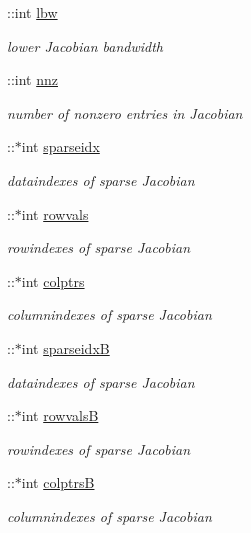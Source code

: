 \begin{DoxyCompactItemize}
\+::int \hyperlink{classamimodel_a784f5fb2b8eda576179be087c2a09a39}{lbw}
\begin{DoxyCompactList}\small\item\em lower Jacobian bandwidth \end{DoxyCompactList}\item 
\+::int \hyperlink{classamimodel_a825ec588729c090ff51ea3473dcbc6b9}{nnz}
\begin{DoxyCompactList}\small\item\em number of nonzero entries in Jacobian \end{DoxyCompactList}\item 
\+::$\ast$int \hyperlink{classamimodel_a6ffb112eda9ff756e17104210981b30b}{sparseidx}
\begin{DoxyCompactList}\small\item\em dataindexes of sparse Jacobian \end{DoxyCompactList}\item 
\+::$\ast$int \hyperlink{classamimodel_aa0abea3560da3f409a28567f42d52872}{rowvals}
\begin{DoxyCompactList}\small\item\em rowindexes of sparse Jacobian \end{DoxyCompactList}\item 
\+::$\ast$int \hyperlink{classamimodel_a887e8a11654afa197d040d8bb10cbb38}{colptrs}
\begin{DoxyCompactList}\small\item\em columnindexes of sparse Jacobian \end{DoxyCompactList}\item 
\+::$\ast$int \hyperlink{classamimodel_adcfae93a688a66f1954d0832f51e4cc0}{sparseidx\+B}
\begin{DoxyCompactList}\small\item\em dataindexes of sparse Jacobian \end{DoxyCompactList}\item 
\+::$\ast$int \hyperlink{classamimodel_a1ba81ee0e28fe7c7576911973c82be70}{rowvals\+B}
\begin{DoxyCompactList}\small\item\em rowindexes of sparse Jacobian \end{DoxyCompactList}\item 
\+::$\ast$int \hyperlink{classamimodel_a3a4891c5565b544dd7d4362dbbfaadf7}{colptrs\+B}
\begin{DoxyCompactList}\small\item\em columnindexes of sparse Jacobian \end{DoxyCompactList}\item 

\end{DoxyCompactItemize}
